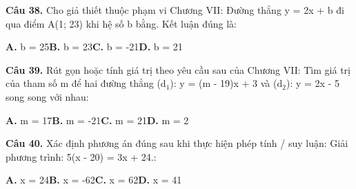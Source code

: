 \documentclass[11pt,a4paper]{article}
\begin{document}
\textbf{\color{primary} Câu 38.} Cho giả thiết thuộc phạm vi Chương VII: Đường thẳng y = 2x + b đi qua điểm A(1; 23) khi hệ số b bằng. Kết luận đúng là:\par
\hspace*{1.5em}\textbf{A.} b = 25\quad\quad \textbf{B.} b = 23\quad\quad \textbf{C.} b = -21\quad\quad \textbf{D.} b = 21\par\vspace{2pt}
\textbf{\color{primary} Câu 39.} Rút gọn hoặc tính giá trị theo yêu cầu sau của Chương VII: Tìm giá trị của tham số m để hai đường thẳng (d$_1$): y = (m - 19)x + 3 và (d$_2$): y = 2x - 5 song song với nhau:\par
\hspace*{1.5em}\textbf{A.} m = 17\quad\quad \textbf{B.} m = -21\quad\quad \textbf{C.} m = 21\quad\quad \textbf{D.} m = 2\par\vspace{2pt}
\textbf{\color{primary} Câu 40.} Xác định phương án đúng sau khi thực hiện phép tính / suy luận: Giải phương trình: 5(x - 20) = 3x + 24.:\par
\hspace*{1.5em}\textbf{A.} x = 24\quad\quad \textbf{B.} x = -62\quad\quad \textbf{C.} x = 62\quad\quad \textbf{D.} x = 41\par\vspace{2pt}
\end{document}
